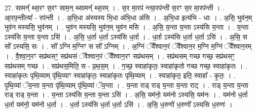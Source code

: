 \documentclass[17pt]{extarticle}
\begin{document}
27. सामन्᳚ थ्स॒रꣳ स॒रꣳ साम॒न् थ्सामन्᳚ थ्स॒रम् । . स॒र मा॒रप॑ न्त्या॒रप॑न्ती स॒रꣳ स॒र मा॒रप॑न्ती । . आ॒रप॒न्तीत्या᳚ - रप॑न्ती । . अ॒भि॒धा अ॑स्यस्य भि॒धा अ॑भि॒धा अ॑सि । . अ॒भि॒धा इत्य॑भि - धाः । . अ॒सि॒ भुव॑न॒म् भुव॑न मस्यसि॒ भुव॑नम् । . भुव॑न मस्यसि॒ भुव॑न॒म् भुव॑न मसि । . अ॒सि॒ य॒न्ता य॒न्ता ऽस्य॑सि य॒न्ता । . य॒न्ता ऽस्य॑सि य॒न्ता य॒न्ता ऽसि॑ । . अ॒सि॒ ध॒र्ता ध॒र्ता ऽस्य॑सि ध॒र्ता । . ध॒र्ता ऽस्य॑सि ध॒र्ता ध॒र्ता ऽसि॑ । . अ॒सि॒ स सो᳚ ऽस्यसि॒ सः । . सो᳚ ऽग्नि म॒ग्निꣳ स सो᳚ ऽग्निम् । . अ॒ग्निं ॅवै᳚श्वान॒रं ॅवै᳚श्वान॒र म॒ग्नि म॒ग्निं ॅवै᳚श्वान॒रम् । . वै॒श्वा॒न॒रꣳ सप्र॑थसꣳ॒॒ सप्र॑थसं ॅवैश्वान॒रं ॅवै᳚श्वान॒रꣳ सप्र॑थसम् । . सप्र॑थसम् गच्छ गच्छ॒ सप्र॑थसꣳ॒॒ सप्र॑थसम् गच्छ । . सप्र॑थस॒मिति॒ स - प्र॒थ॒स॒म् । . ग॒च्छ॒ स्वाहा॑कृतः॒ स्वाहा॑कृतो गच्छ गच्छ॒ स्वाहा॑कृतः । . स्वाहा॑कृतः पृथि॒व्याम् पृ॑थि॒व्याꣳ स्वाहा॑कृतः॒ स्वाहा॑कृतः पृथि॒व्याम् । . स्वाहा॑कृत॒ इति॒ स्वाहा᳚ - कृ॒तः॒ । . पृ॒थि॒व्यां ॅय॒न्ता य॒न्ता पृ॑थि॒व्याम् पृ॑थि॒व्यां ॅय॒न्ता । . य॒न्ता राड् राड् य॒न्ता य॒न्ता राट् । . राड् य॒न्ता य॒न्ता राड् राड् य॒न्ता । . य॒न्ता ऽस्य॑सि य॒न्ता य॒न्ता ऽसि॑ । . अ॒सि॒ यम॑नो॒ यम॑नो ऽस्यसि॒ यम॑नः । . यम॑नो ध॒र्ता ध॒र्ता यम॑नो॒ यम॑नो ध॒र्ता । . ध॒र्ता ऽस्य॑सि ध॒र्ता ध॒र्ता ऽसि॑ । . अ॒सि॒ ध॒रुणो॑ ध॒रुणो᳚ ऽस्यसि ध॒रुणः॑ । \newline
\end{document}
